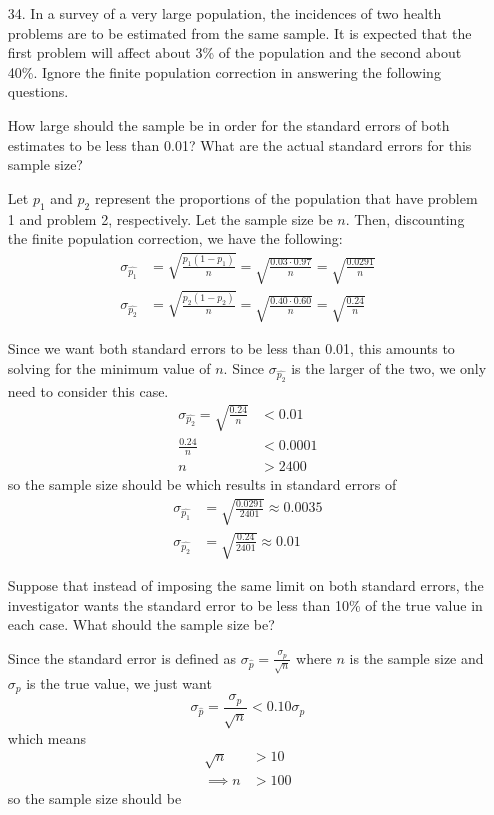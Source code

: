 \documentclass{article}
\begin{document}
\begin{itemize}
	\item[34.] In a survey of a very large population, the incidences of two health problems are to be estimated from the same sample. It is expected that the first problem will affect about 3\% of the population and the second about 40\%. Ignore the finite population correction in answering the following questions.
		\begin{enumerate}[a.]
			\ii How large should the sample be in order for the standard errors of both estimates to be less than 0.01? What are the actual standard errors for this sample size?
			\begin{soln}
				Let $p_1$ and $p_2$ represent the proportions of the population that have problem 1 and problem 2, respectively. Let the sample size be $n.$ Then, discounting the finite population correction, we have the following:
				\begin{align*}
					\sigma_{\hat{p_1}} &= \sqrt{\frac{p_1(1-p_1)}{n}} = \sqrt{\frac{0.03\cdot0.97}{n}} = \sqrt{\frac{0.0291}{n}} \\
					\sigma_{\hat{p_2}} &= \sqrt{\frac{p_2(1-p_2)}{n}} = \sqrt{\frac{0.40\cdot0.60}{n}} = \sqrt{\frac{0.24}{n}}
				\end{align*}

				Since we want both standard errors to be less than 0.01, this amounts to solving for the minimum value of $n.$ Since $\sigma_{\hat{p_2}}$ is the larger of the two, we only need to consider this case. 
				\begin{align*}
					\sigma_{\hat{p_2}} = \sqrt{\frac{0.24}{n}} &< 0.01 \\
					\frac{0.24}{n} &< 0.0001 \\
					n &> 2400
				\end{align*} so the sample size should be  which results in standard errors of 
				\begin{align*}
					\sigma_{\hat{p_1}} &= \sqrt{\frac{0.0291}{2401}} \approx \boxed{0.0035} \\
					\sigma_{\hat{p_2}} &= \sqrt{\frac{0.24}{2401}} \approx \boxed{0.01}
				\end{align*}
			\end{soln}

			\ii Suppose that instead of imposing the same limit on both standard errors, the investigator wants the standard error to be less than 10\% of the true value in each case. What should the sample size be?
			\begin{soln}
				Since the standard error is defined as $\sigma_{\hat{p}}=\frac{\sigma_p}{\sqrt{n}}$ where $n$ is the sample size and $\sigma_p$ is the true value, we just want \[\sigma_{\hat{p}} = \frac{\sigma_p}{\sqrt{n}} < 0.10\sigma_p\] which means 
				\begin{align*}
					\sqrt{n} & > 10 \\
					\implies n & > 100
				\end{align*} so the sample size should be \boxed{\text{at least 101}.}


\end{soln}
\end{enumerate}
\end{itemize}
\end{document}
